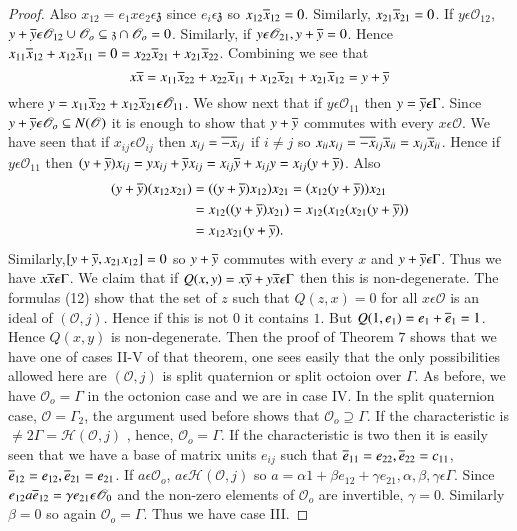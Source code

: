 \begin{proof}
Also $x_{12}=e_1xe_2\epsilon \mathfrak{z}$ since $e_i\epsilon
\mathfrak{z}$ so $x_{12}\overline{x}_{12}=0$. Similarly,
  $x_{21}\overline{x}_{21}=0$. If $y\epsilon \mathscr{O}_{12}$,
  $y+\overline{y}\epsilon\mathscr{O}_{12}\cup
  \mathscr{O}_o\subseteq\mathfrak{z}\cap\mathscr{O}_o=0$. Similarly,
  if $y\epsilon \mathscr{O}_{21},y+\overline{y}=0$. Hence
  $x_{11}\overline{x}_{12}+x_{12}\overline{x}_{11}=0=x_{22}\overline{x}_{21}+x_{21}\overline{x}_{22}$.
Combining we see that 
$$
x\overline{x}=x_{11}\overline{x}_{22}+x_{22}\overline{x}_{11}+x_{12}\overline{x}_{21}+x_{21}\overline{x}_{12}=y+\overline{y}
$$
where $y=x_{11}\overline{x}_{22}+x_{12}\overline{x}_{21}\epsilon
\mathscr{O}_{11}$. We show next that if $y\epsilon \mathscr{O}_{11}$
then $y=\overline{y}\epsilon \Gamma$. Since $y+\overline{y}\epsilon
\mathscr{O}_o\subseteq N(\mathscr{O})$ it is enough to show that
$y+\overline{y}$ commutes with every $x\epsilon \mathscr{O}$. We have seen
that if $x_{ij}\epsilon \mathscr{O}_{ij}$ then $x_{ij}=\overline{-x}_{ij}$
if $i\neq j$ so
$x_{ii}x_{ij}=\overline{-x}_{ij}\overline{x}_{ii}=x_{ij}\overline{x}_{ii}$. Hence if
$y\epsilon \mathscr{O}_{11}$ then
$(y+\overline{y})x_{ij}=yx_{ij}+\overline{y}x_{ij}= x_{ij}\overline{y}+x_{ij}y= x_{ij}
(y+\overline{y})$. Also  
\begin{align*}
(y+\overline{y})(x_{12}x_{21})&=((y+\overline{y})x_{12})x_{21}=(x_{12}(y+\overline{y}))x_{21}\\
&=x_{12}((y+\overline{y})x_{21})=x_{12}(x_{12}(x_{21}(y+\overline{y}))\\
&=x_{12}x_{21}(y+\overline{y}).
\end{align*}
Similarly,\pageoriginale $[y+\overline{y},x_{21}x_{12}]=0$ so $y+\overline{y}$ commutes with
every $x$ and $y+\overline{y}\epsilon \Gamma$. Thus we have $x\overline{x}\epsilon
\Gamma$. We claim that if $Q(x,y)=x\overline{y}+y\overline{x}\epsilon\Gamma$ then
this is non-degenerate. The formulas (12) show that the set of $z$
such that $Q(z,x)=0$ for all $x\epsilon\mathscr{O}$ is an ideal of
$(\mathscr{O},j)$. Hence if this is not $0$ it contains $1$. But
$Q(1,e_1)=e_1+\overline{e}_1=1$. Hence $Q(x,y)$ is non-degenerate. Then the
proof of Theorem $7$ shows that we have one of cases II-V of that
theorem, one sees easily that the only possibilities allowed here are
$(\mathscr{O},j)$ is split quaternion or split octoion over
$\Gamma$. As before, we have $\mathscr{O}_o=\Gamma$ in the octonion
case and we are in case IV. In the split quaternion case,
$\mathscr{O}=\Gamma_2$, the argument used before shows that
$\mathscr{O}_o\supseteq\Gamma$. If the characteristic is $\neq 2\Gamma
=\mathscr{H}(\mathscr{O},j)$ , hence, $\mathscr{O}_o=\Gamma$. If the
characteristic is two then it is easily seen that we have a base of
matrix units $e_{ij}$ such that
$\overline{e}_{11}=e_{22},\overline{e}_{22}=c_{11}$,
$\overline{e}_{12}=e_{12},\overline{e}_{21}=e_{21}$. If 
$a\epsilon \mathscr{O}_{o}$, $a\epsilon\mathscr{H}(\mathscr{O},j)$ so
  $a=\alpha 1+\beta e_{12}+\gamma e_{21},\alpha,\beta, \gamma \epsilon
  \Gamma$. Since $e_{12}a\overline{e}_{12}=\gamma e_{21}\epsilon
  \mathscr{O}_0$ and the non-zero elements of $\mathscr{O}_o$ are
  invertible, $\gamma=0$. Similarly $\beta=0$ so again
  $\mathscr{O}_o=\Gamma$. Thus we have case III.
\end{proof}

